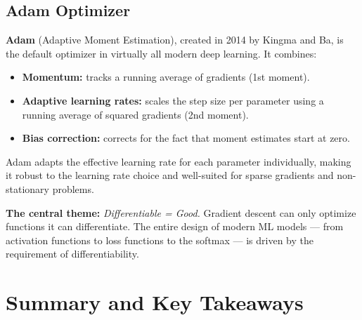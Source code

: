 \documentclass[12pt]{article}
\begin{document}
\subsection{Adam Optimizer}

\textbf{Adam} (Adaptive Moment Estimation), created in 2014 by Kingma and Ba, is the default optimizer in virtually all modern deep learning. It combines:
\begin{itemize}
  \item \textbf{Momentum:} tracks a running average of gradients (1st moment).
  \item \textbf{Adaptive learning rates:} scales the step size per parameter using a running average of squared gradients (2nd moment).
  \item \textbf{Bias correction:} corrects for the fact that moment estimates start at zero.
\end{itemize}

Adam adapts the effective learning rate for each parameter individually, making it robust to the learning rate choice and well-suited for sparse gradients and non-stationary problems.

\begin{takeawaybox}
\textbf{The central theme:} \textit{Differentiable = Good.} Gradient descent can only optimize functions it can differentiate. The entire design of modern ML models --- from activation functions to loss functions to the softmax --- is driven by the requirement of differentiability.
\end{takeawaybox}

\section{Summary and Key Takeaways}
\end{document}
